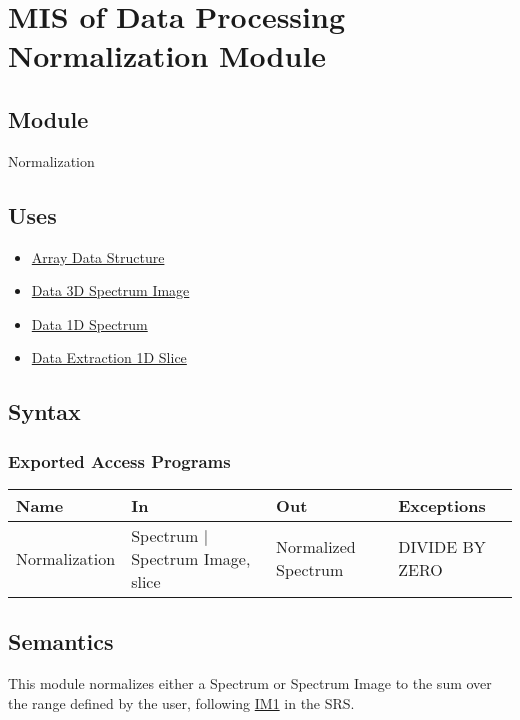 \documentclass[12pt, titlepage]{article}
\begin{document}
\section{MIS of Data Processing Normalization Module} \label{Mod:Normalization}

\subsection{Module}
Normalization

\subsection{Uses}
\begin{itemize}
    \item \hyperref[Mod:Array]{Array Data Structure}
    \item \hyperref[Mod:SI]{Data 3D Spectrum Image}
    \item \hyperref[Mod:Spectrum]{Data 1D Spectrum}
    \item \hyperref[Mod:Slice1D]{Data Extraction 1D Slice}
\end{itemize}

\subsection{Syntax}

\subsubsection{Exported Access Programs}

\begin{center}
\begin{tabular}{p{3cm} p{4cm} p{4cm} p{2cm}}
\hline
\textbf{Name} & \textbf{In} & \textbf{Out} & \textbf{Exceptions} \\
\hline
Normalization & Spectrum $|$ Spectrum Image, slice & Normalized Spectrum & DIVIDE BY ZERO \\
\hline
\end{tabular}
\end{center}

\subsection{Semantics}
This module normalizes either a Spectrum or Spectrum Image to the sum over the range defined by the user, following \hyperref[normalization]{IM1} in the SRS.
\end{document}

